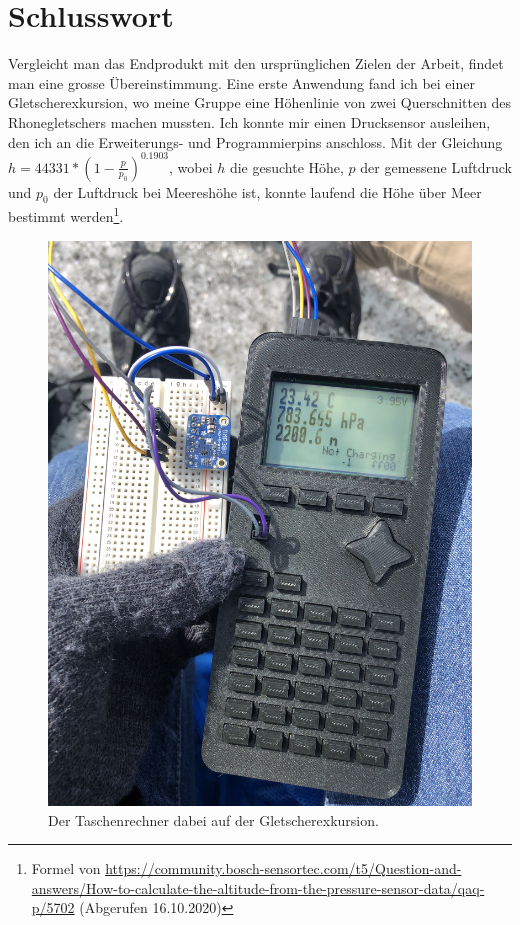 \documentclass[12pt, a4paper]{report}
\begin{document}
\chapter{Schlusswort}\label{excursion}
Vergleicht man das Endprodukt mit den ursprünglichen Zielen der Arbeit, findet man eine grosse Übereinstimmung.  Eine erste Anwendung fand ich bei einer Gletscherexkursion, wo meine Gruppe eine Höhenlinie von zwei Querschnitten des Rhonegletschers machen mussten. Ich konnte mir einen Drucksensor ausleihen, den ich an die Erweiterungs- und Programmierpins anschloss. Mit der Gleichung $h=44331*(1-\frac{p}{p_{0}})^{0.1903}$, wobei $h$ die gesuchte Höhe, $p$ der gemessene Luftdruck und $p_{0}$ der Luftdruck bei Meereshöhe ist, konnte laufend die Höhe über Meer bestimmt werden\footnote{Formel von \url{https://community.bosch-sensortec.com/t5/Question-and-answers/How-to-calculate-the-altitude-from-the-pressure-sensor-data/qaq-p/5702} (Abgerufen 16.10.2020)}.
\begin{center}
\begin{figure}[H]
\centering
\includegraphics[width=0.45\linewidth]{assets/glacier.jpg}
\caption{Der Taschenrechner dabei auf der Gletscherexkursion.}
\end{figure}
\end{center}
\end{document}
